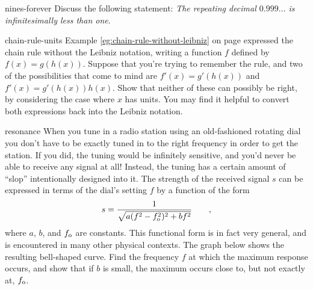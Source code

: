 \begin{hwsection}
\begin{hwwithsoln}{nines-forever}
Discuss the following statement: \emph{The repeating decimal $0.999\ldots$ is infinitesimally less than one}.
\end{hwwithsoln}

\begin{hwwithsoln}{chain-rule-units}
Example \ref{eg:chain-rule-without-leibniz} on page \pageref{eg:chain-rule-without-leibniz}
expressed the chain rule without the Leibniz notation, writing a function $f$ defined by
$f(x)=g(h(x))$. Suppose that you're trying to remember the rule, and two of the possibilities
that come to mind are $f'(x)=g'(h(x))$ and $f'(x)=g'(h(x))h(x)$. Show that neither of these
can possibly be right, by considering the case where $x$ has units. You may find it helpful
to convert both expressions back into the Leibniz notation.
\end{hwwithsoln}

\begin{hwwithsoln}{resonance}
When you tune in a radio station using an old-fashioned rotating dial you don't have to be
exactly tuned in to the right frequency in order to get the station. If you did, the
tuning would be infinitely sensitive, and you'd never be able to receive any signal at
all! Instead, the tuning has a certain amount of ``slop'' intentionally designed into it.
The strength of the received signal $s$ can be expressed in terms of the dial's setting
$f$ by a function of the form
\begin{equation*}
  s = \frac{1}{\sqrt{a(f^2-f_{\textup{o}}^2)^2+bf^2}} \qquad ,
\end{equation*}
where $a$, $b$, and $f_{\textup{o}}$ are constants. This functional form is in fact very general, and
is encountered in many other physical contexts. The graph below shows the resulting bell-shaped
curve. Find the frequency $f$ at which the maximum response occurs, and show that if $b$ is small,
the maximum occurs close to, but not exactly at, $f_{\textup{o}}$.
\end{hwwithsoln}

%


\end{hwsection}
